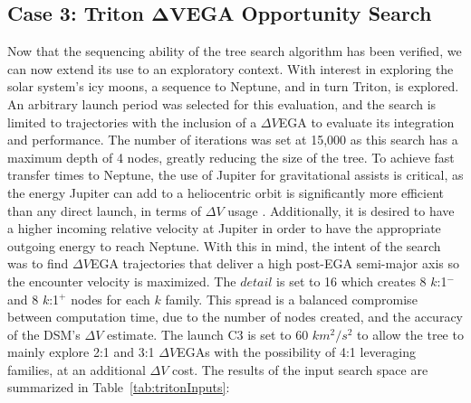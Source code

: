 \documentclass[letterpaper, preprint, paper,11pt]{AAS}	%
\begin{document}
\subsection*{Case 3: Triton $\boldsymbol{\Delta V}$EGA Opportunity Search}

Now that the sequencing ability of the tree search algorithm has been verified, we can now extend its use to an exploratory context. With interest in exploring the solar system's icy moons, a sequence to Neptune, and in turn Triton, is explored\cite{Hubbard2010}. An arbitrary launch period was selected for this evaluation, and the search is limited to trajectories with the inclusion of a $\Delta V$EGA to evaluate its integration and performance. The number of iterations was set at 15,000 as this search has a maximum depth of 4 nodes, greatly reducing the size of the tree. To achieve fast transfer times to Neptune, the use of Jupiter for gravitational assists is critical, as the energy Jupiter can add to a heliocentric orbit is significantly more efficient than any direct launch, in terms of $\Delta V$ usage \cite{Landau2010}. Additionally, it is desired to have a higher incoming relative velocity at Jupiter in order to have the appropriate outgoing energy to reach Neptune. With this in mind, the intent of the search was to find $\Delta V$EGA trajectories that deliver a high post-EGA semi-major axis so the encounter velocity is maximized. The $\textit{detail}$ is set to 16 which creates 8 $k$:1$^{-}$ and 8 $k$:1$^{+}$ nodes for each $k$ family. This spread is a balanced compromise between computation time, due to the number of nodes created, and the accuracy of the DSM's $\Delta V$ estimate. The launch C3 is set to 60 $km^2/s^2$ to allow the tree to mainly explore 2:1 and 3:1 $\Delta V$EGAs with the possibility of 4:1 leveraging families, at an additional $\Delta V$ cost. The results of the input search space are summarized in Table~\ref{tab:tritonInputs}:
\end{document}

